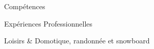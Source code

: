 


\begin{rubriquetableau}[\firstcolumnwidth]{Compétences}
	
	
\end{rubriquetableau}

\begin{rubriquetableau}[\firstcolumnwidth]{Expériences Professionnelles}
  
  
  
	
\end{rubriquetableau}



\begin{rubriquetableau}[\firstcolumnwidth]{Loisirs}
	& Domotique, randonnée et snowboard
\end{rubriquetableau}
